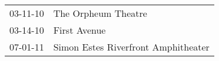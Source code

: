\begin{supertabular}{p{0.25\columnwidth}p{0.75\columnwidth}}
 03-11-10 &                  The Orpheum Theatre \\
 03-14-10 &                         First Avenue \\
 07-01-11 &  Simon Estes Riverfront Amphitheater \\
\end{supertabular}
